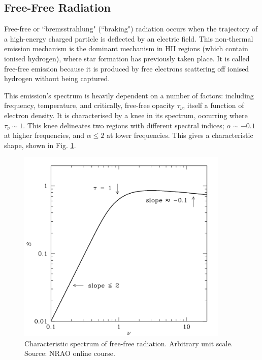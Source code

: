 \subsection{Free-Free Radiation}
\pg
Free-free or ``bremsstrahlung" (``braking") radiation occurs when the trajectory of a high-energy charged particle is deflected by an electric field. This non-thermal emission mechanism is the dominant mechanism in HII regions (which contain ionised hydrogen), where star formation has previously taken place. It is called free-free emission because it is produced by free electrons scattering off ionised hydrogen without being captured. %

\pg
This emission's spectrum is heavily dependent on a number of factors: including frequency, temperature, and critically, free-free opacity $\tau_\nu$, itself a function of electron density. It is characterised by a knee in its spectrum, occurring where $\tau_\nu\sim 1$. This knee delineates two regions with different spectral indices; $\alpha \sim -0.1$ at higher frequencies, and $\alpha \leq 2$ at lower frequencies. This gives a characteristic shape, shown in Fig. \ref{plot.freefree.spectrum}.
\begin{figure}[!h]
\centering
\includegraphics[width=0.9\textwidth]{images/freefree.png}
\caption{\label{plot.freefree.spectrum} Characteristic spectrum of free-free radiation. Arbitrary unit scale. Source: NRAO online course.}
\end{figure}

